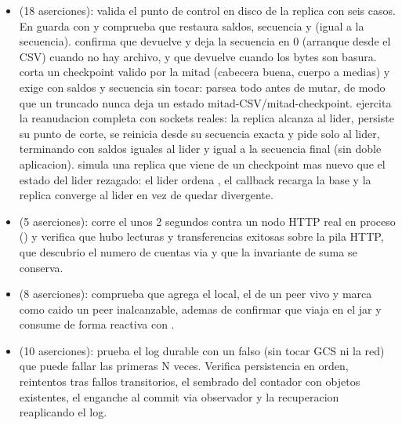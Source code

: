 \begin{itemize}
\item {} (18 aserciones): valida el punto de
control en disco de la replica con seis casos. En  guarda con
 y comprueba que  restaura saldos, secuencia y
 (igual a la secuencia). 
confirma que  devuelve  y deja la secuencia en 0 (arranque
desde el CSV) cuando no hay archivo, y  que devuelve 
cuando los bytes son basura.  corta un checkpoint valido por la mitad (cabecera
buena, cuerpo a medias) y exige  con saldos y secuencia sin tocar: 
parsea todo antes de mutar, de modo que un truncado nunca deja un estado
mitad-CSV/mitad-checkpoint.  ejercita la reanudacion completa con
sockets reales: la replica alcanza al lider, persiste su punto de corte, se reinicia
desde su secuencia exacta y pide solo  al lider, terminando con saldos
iguales al lider y  igual a la secuencia final (sin doble
aplicacion).  simula una replica que viene de un checkpoint
mas nuevo que el estado del lider rezagado: el lider ordena , el callback
 recarga la base y la replica converge al lider en vez de quedar
divergente.

\item {} (5 aserciones): corre el
 unos 2 segundos contra un nodo HTTP real en proceso
() y verifica que hubo lecturas y transferencias
exitosas sobre la pila HTTP, que descubrio el numero de cuentas via
 y que la invariante de suma se conserva.

\item {} (8 aserciones): comprueba que
 agrega el  local, el de un peer vivo y marca como
caido un peer inalcanzable, ademas de confirmar que  viaja
en el jar y consume  de forma reactiva con .

\item {} (10 aserciones): prueba el log durable
con un  falso (sin tocar GCS ni la red) que puede fallar las
primeras N veces. Verifica persistencia en orden, reintentos tras fallos
transitorios, el sembrado del contador con objetos existentes, el enganche al
commit via observador y la recuperacion reaplicando el log.


\end{itemize}
